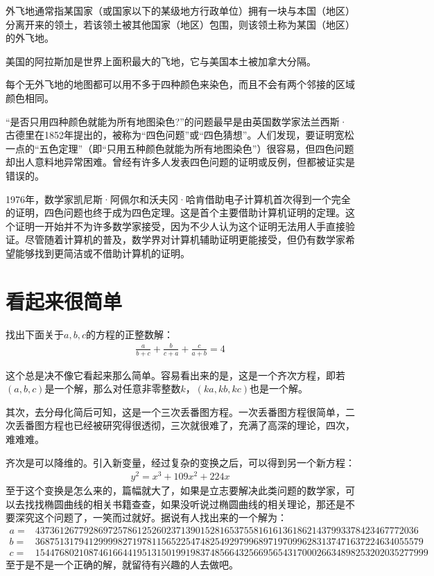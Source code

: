 \begin{definition}
  外飞地通常指某国家（或国家以下的某级地方行政单位）拥有一块与本国（地区）分离开来的领土，若该领土被其他国家（地区）包围，则该领土称为某国（地区）的外飞地。
\end{definition}

美国的阿拉斯加是世界上面积最大的飞地，它与美国本土被加拿大分隔。

\begin{example}
  每个无外飞地的地图都可以用不多于四种颜色来染色，而且不会有两个邻接的区域颜色相同。
\end{example}

“是否只用四种颜色就能为所有地图染色?”的问题最早是由英国数学家法兰西斯·古德里在1852年提出的，被称为“四色问题”或“四色猜想”。人们发现，要证明宽松一点的“五色定理”（即“只用五种颜色就能为所有地图染色”）很容易，但四色问题却出人意料地异常困难。曾经有许多人发表四色问题的证明或反例，但都被证实是错误的。

1976年，数学家凯尼斯·阿佩尔和沃夫冈·哈肯借助电子计算机首次得到一个完全的证明，四色问题也终于成为四色定理。这是首个主要借助计算机证明的定理。这个证明一开始并不为许多数学家接受，因为不少人认为这个证明无法用人手直接验证。尽管随着计算机的普及，数学界对计算机辅助证明更能接受，但仍有数学家希望能够找到更简洁或不借助计算机的证明。

\section{看起来很简单}
\label{sec:looks-simple}

\begin{example}
  找出下面关于$a,b,c$的方程的正整数解：
  \begin{align*}
    \frac{a}{b+c}+\frac{b}{c+a}+\frac{c}{a+b}=4
  \end{align*}
\end{example}
这个总是决不像它看起来那么简单。容易看出来的是，这是一个齐次方程，即若$(a,b,c)$是一个解，那么对任意非零整数$k$，$(ka, kb, kc)$也是一个解。

其次，去分母化简后可知，这是一个三次丢番图方程。一次丢番图方程很简单，二次丢番图方程也已经被研究得很透彻，三次就很难了，充满了高深的理论，四次，难难难。

齐次是可以降维的。引入新变量，经过复杂的变换之后，可以得到另一个新方程：
\begin{align*}
  y^2=x^3+109x^2+224x
\end{align*}
至于这个变换是怎么来的，篇幅就大了，如果是立志要解决此类问题的数学家，可以去找找椭圆曲线的相关书籍查查，如果没听说过椭圆曲线的相关理论，那还是不要深究这个问题了，一笑而过就好。据说有人找出来的一个解为：
{\tiny
\begin{align*}
  a={}&4373612677928697257861252602371390152816537558161613618621437993378423467772036\\
  b={}&36875131794129999827197811565225474825492979968971970996283137471637224634055579\\
  c={}&154476802108746166441951315019919837485664325669565431700026634898253202035277999  
\end{align*}
}
至于是不是一个正确的解，就留待有兴趣的人去做吧。

